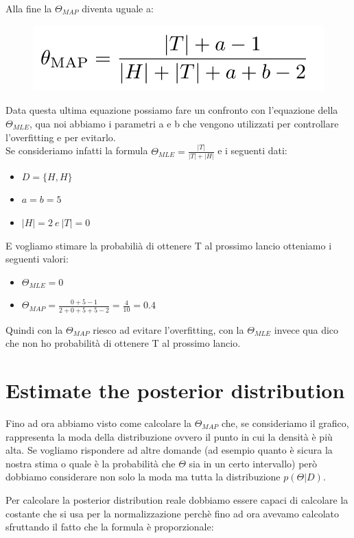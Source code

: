 \documentclass[14pt]{extreport}
\begin{document}
Alla fine la $\Theta_{MAP}$ diventa uguale a:
\begin{figure}[H]
	\centering
	\includegraphics[width=0.4\linewidth]{42.jpeg}
\end{figure}

Data questa ultima equazione possiamo fare un confronto con l'equazione della $\Theta_{MLE}$, qua noi abbiamo i parametri a e b che vengono utilizzati
per controllare l'overfitting e per evitarlo. \\
Se consideriamo infatti la formula $\Theta_{MLE} = \frac{|T|}{|T|+|H|}$ e i seguenti dati:
\begin{itemize}
	\item $D = \{H, H\}$
	\item $a=b=5$
	\item $|H| = 2 \ e\ |T| = 0$
\end{itemize}

E vogliamo stimare la probabilià di ottenere T al prossimo lancio otteniamo i seguenti valori:
\begin{itemize}
	\item $\Theta_{MLE} = 0$
	\item $\Theta_{MAP} = \frac{0+5-1}{2+0+5+5-2} = \frac{4}{10} = 0.4$
\end{itemize}

Quindi con la $\Theta_{MAP}$ riesco ad evitare l'overfitting, con la $\Theta_{MLE}$ invece qua dico che non ho probabilità di ottenere T al prossimo
lancio.

\section{Estimate the posterior distribution}

Fino ad ora abbiamo visto come calcolare la $\Theta_{MAP}$ che, se consideriamo il grafico, rappresenta la moda della distribuzione ovvero il punto in
cui la densità è più alta. Se vogliamo rispondere ad altre domande (ad esempio quanto è sicura la nostra stima o quale è la probabilità che $\Theta$
sia in un certo intervallo) però dobbiamo considerare non solo la moda ma tutta la distribuzione $p(\Theta | D)$.

Per calcolare la posterior distribution reale dobbiamo essere capaci di calcolare la costante che si usa per la normalizzazione perchè fino ad ora
avevamo calcolato sfruttando il fatto che la formula è proporzionale:
\end{document}
